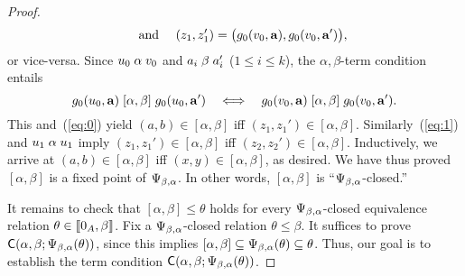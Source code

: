 \begin{proof}
\[    \quad \text{ and } \quad 
    (z_1,z_1')= \bigl(g_0(v_0, \mathbf{a}), g_0(v_0, \mathbf{a}')\bigr),
    \]
    or vice-versa.  Since $u_0 \mathrel{\alpha} v_0$ and 
    $a_i \mathrel{\beta} a_i'$ ($1\leq i\leq k$), the $\alpha,\beta$-term condition
    entails
    \[
    g_0(u_0, \mathbf{a}) \mathrel{[\alpha, \beta]} g_0(u_0, \mathbf{a}')
    \quad \Longleftrightarrow \quad 
    g_0(v_0, \mathbf{a}) \mathrel{[\alpha, \beta]} g_0(v_0, \mathbf{a}').
    \]
    This and~(\ref{eq:0}) yield
    $(a,b)\in [\alpha, \beta]$ iff
    $(z_1,z_1')\in [\alpha, \beta]$.
    Similarly~(\ref{eq:1}) and $u_1 \mathrel{\alpha} u_1$ imply
    $(z_1,z_1')\in [\alpha, \beta]$ iff
    $(z_2,z_2')\in [\alpha, \beta]$.  Inductively, we arrive at 
    $(a,b)\in [\alpha, \beta]$ iff $(x,y)\in [\alpha, \beta]$, as desired.
    We have thus proved $[\alpha, \beta]$ is a fixed point of $\Psi_{\beta, \alpha}$.
    In other words, 
    $[\alpha, \beta]$ is ``$\Psi_{\beta, \alpha}$-closed.''

    It remains to check that $[\alpha, \beta] \leq \theta$ holds
    for every $\Psi_{\beta, \alpha}$-closed equivalence relation $\theta \in \llbracket 0_A, \beta\rrbracket$. 
    Fix a $\Psi_{\beta, \alpha}$-closed relation $\theta \leq \beta$. %
    It suffices to prove $\mathsf{C}(\alpha, \beta; \Psi_{\beta, \alpha}(\theta))$, since this implies 
    $[\alpha, \beta] \subseteq \Psi_{\beta, \alpha}(\theta) \subseteq \theta$.
    Thus, our goal is to establish the term condition
    $\mathsf{C}(\alpha, \beta; \Psi_{\beta, \alpha}(\theta))$.


\end{proof}
